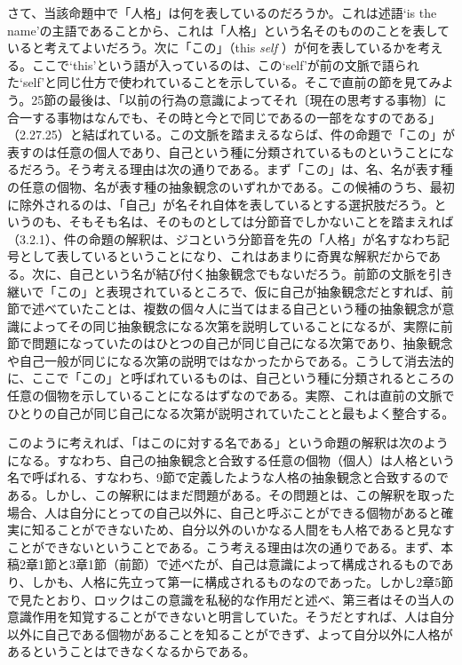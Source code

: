 \documentclass[a4j,oneside]{jsbook}
\begin{document}
さて、当該命題中で「人格」は何を表しているのだろうか。これは述語‘is the name’の主語であることから、これは「人格」という名そのもののことを表していると考えてよいだろう。次に「この」（this {\itshape self} ）が何を表しているかを考える。ここで‘this’という語が入っているのは、この‘self’が前の文脈で語られた‘self’と同じ仕方で使われていることを示している。そこで直前の節を見てみよう。25節の最後は、「以前の行為の意識によってそれ〔現在の思考する事物〕に合一する事物はなんでも、その時と今とで同じであるの一部をなすのである」（2.27.25）と結ばれている。この文脈を踏まえるならば、件の命題で「この」が表すのは任意の個人であり、自己という種に分類されているものということになるだろう。そう考える理由は次の通りである。まず「この」は、名、名が表す種の任意の個物、名が表す種の抽象観念のいずれかである。この候補のうち、最初に除外されるのは、「自己」が名それ自体を表しているとする選択肢だろう。というのも、そもそも名は、そのものとしては分節音でしかないことを踏まえれば（3.2.1）、件の命題の解釈は、ジコという分節音を先の「人格」が名すなわち記号として表しているということになり、これはあまりに奇異な解釈だからである。次に、自己という名が結び付く抽象観念でもないだろう。前節の文脈を引き継いで「この」と表現されているところで、仮に自己が抽象観念だとすれば、前節で述べていたことは、複数の個々人に当てはまる自己という種の抽象観念が意識によってその同じ抽象観念になる次第を説明していることになるが、実際に前節で問題になっていたのはひとつの自己が同じ自己になる次第であり、抽象観念や自己一般が同じになる次第の説明ではなかったからである。こうして消去法的に、ここで「この」と呼ばれているものは、自己という種に分類されるところの任意の個物を示していることになるはずなのである。実際、これは直前の文脈でひとりの自己が同じ自己になる次第が説明されていたことと最もよく整合する。
\par
このように考えれば、「はこのに対する名である」という命題の解釈は次のようになる。すなわち、自己の抽象観念と合致する任意の個物（個人）は人格という名で呼ばれる、すなわち、9節で定義したような人格の抽象観念と合致するのである。しかし、この解釈にはまだ問題がある。その問題とは、この解釈を取った場合、人は自分にとっての自己以外に、自己と呼ぶことができる個物があると確実に知ることができないため、自分以外のいかなる人間をも人格であると見なすことができないということである。こう考える理由は次の通りである。まず、本稿2章1節と3章1節（前節）で述べたが、自己は意識によって構成されるものであり、しかも、人格に先立って第一に構成されるものなのであった。しかし2章5節で見たとおり、ロックはこの意識を私秘的な作用だと述べ、第三者はその当人の意識作用を知覚することができないと明言していた。そうだとすれば、人は自分以外に自己である個物があることを知ることができず、よって自分以外に人格があるということはできなくなるからである。
\end{document}
